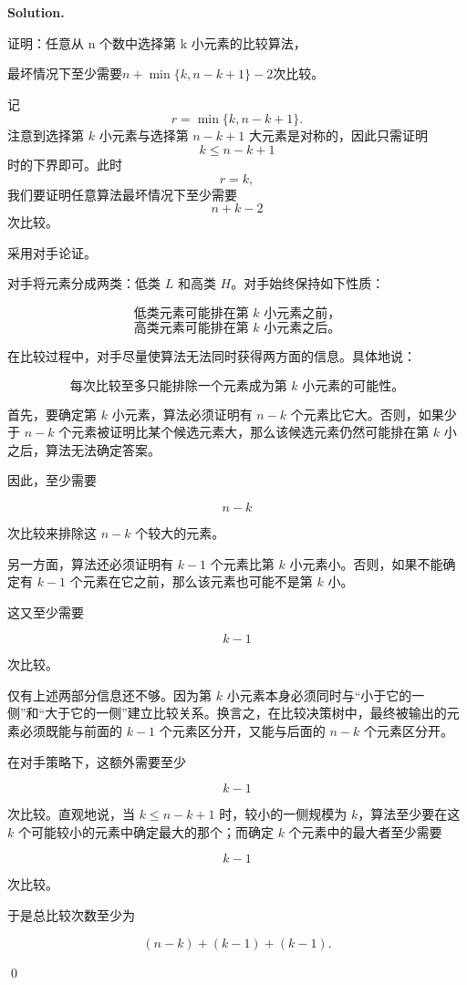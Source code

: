 \documentclass[11pt]{article}
\newenvironment{solution}{
\par\noindent\textbf{Solution.}\par\noindent
}{\qed}
\begin{document}
\begin{solution}

证明：任意从 n 个数中选择第 k 小元素的比较算法，

$
最坏情况下至少需要 
n+\min\{k,n-k+1\}-2
次比较。
$

记
\[
r=\min\{k,n-k+1\}.
\]
注意到选择第 \(k\) 小元素与选择第 \(n-k+1\) 大元素是对称的，因此只需证明
\[
k\leq n-k+1
\]
时的下界即可。此时
\[
r=k,
\]
我们要证明任意算法最坏情况下至少需要
\[
n+k-2
\]
次比较。

采用对手论证。

对手将元素分成两类：低类 \(L\) 和高类 \(H\)。对手始终保持如下性质：

\[
\text{低类元素可能排在第 } k \text{ 小元素之前，}
\]
\[
\text{高类元素可能排在第 } k \text{ 小元素之后。}
\]

在比较过程中，对手尽量使算法无法同时获得两方面的信息。具体地说：

\[
\text{每次比较至多只能排除一个元素成为第 } k \text{ 小元素的可能性。}
\]

首先，要确定第 \(k\) 小元素，算法必须证明有 \(n-k\) 个元素比它大。否则，如果少于 \(n-k\) 个元素被证明比某个候选元素大，那么该候选元素仍然可能排在第 \(k\) 小之后，算法无法确定答案。

因此，至少需要

\[
n-k
\]

次比较来排除这 \(n-k\) 个较大的元素。

另一方面，算法还必须证明有 \(k-1\) 个元素比第 \(k\) 小元素小。否则，如果不能确定有 \(k-1\) 个元素在它之前，那么该元素也可能不是第 \(k\) 小。

这又至少需要

\[
k-1
\]

次比较。

仅有上述两部分信息还不够。因为第 \(k\) 小元素本身必须同时与“小于它的一侧”和“大于它的一侧”建立比较关系。换言之，在比较决策树中，最终被输出的元素必须既能与前面的 \(k-1\) 个元素区分开，又能与后面的 \(n-k\) 个元素区分开。

在对手策略下，这额外需要至少

\[
k-1
\]

次比较。直观地说，当 \(k\leq n-k+1\) 时，较小的一侧规模为 \(k\)，算法至少要在这 \(k\) 个可能较小的元素中确定最大的那个；而确定 \(k\) 个元素中的最大者至少需要

\[
k-1
\]

次比较。

于是总比较次数至少为

\[
(n-k)+(k-1)+(k-1).
\]


\end{solution}
\end{document}
